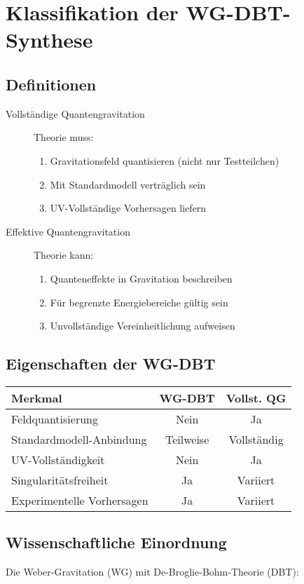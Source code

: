 \section{Klassifikation der WG-DBT-Synthese}

\subsection{Definitionen}
\begin{description}
\item[Vollständige Quantengravitation] Theorie muss:
\begin{enumerate}
\item Gravitationsfeld quantisieren (nicht nur Testteilchen)
\item Mit Standardmodell verträglich sein
\item UV-Vollständige Vorhersagen liefern
\end{enumerate}

\item[Effektive Quantengravitation] Theorie kann:
\begin{enumerate}
\item Quanteneffekte in Gravitation beschreiben
\item Für begrenzte Energiebereiche gültig sein
\item Unvollständige Vereinheitlichung aufweisen
\end{enumerate}
\end{description}

\subsection{Eigenschaften der WG-DBT}
\begin{center}
\begin{tabular}{|l|c|c|}
\hline
\textbf{Merkmal} & \textbf{WG-DBT} & \textbf{Vollst. QG} \\
\hline
Feldquantisierung & Nein & Ja \\
\hline
Standardmodell-Anbindung & Teilweise & Vollständig \\
\hline
UV-Vollständigkeit & Nein & Ja \\
\hline
Singularitätsfreiheit & Ja & Variiert \\
\hline
Experimentelle Vorhersagen & Ja & Variiert \\
\hline
\end{tabular}
\end{center}

\subsection{Wissenschaftliche Einordnung}
Die Weber-Gravitation (WG) mit De-Broglie-Bohm-Theorie (DBT):

